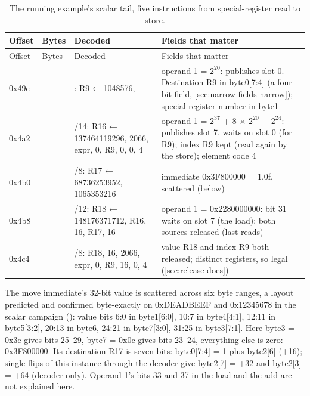 \begin{xltabular}{\linewidth}{@{}l>{\hsize}XX>{\hsize}X@{}}
\caption{The running example's scalar tail, five instructions from special-register read to store.}\label{tab:example-scalar-tail}\\
\toprule
Offset & Bytes & Decoded & Fields that matter \\
\midrule
\endfirsthead
{}
\toprule
Offset & Bytes & Decoded & Fields that matter \\
\midrule
\endhead
0x49e &  & : R9 ← 1048576,  & operand 1 = $2^{20}$: publishes slot 0. Destination R9 in byte0{[}7:4{]}
(a four-bit field, \cref{sec:narrow-fields-narrow}); special
register number in byte1 \\*
0x4a2 &  & /14: R16 ← 137464119296, 2066,
expr, 0, R9, 0, 0, 4 & operand 1 = $2^{37}$ + 8 × $2^{20}$ + $2^{24}$: publishes slot 7, waits on
slot 0 (for R9); index R9 kept (read again by the store); element code 4 \\*
0x4b0 &  & /8: R17 ←
68736253952, 1065353216 & immediate 0x3F800000 = 1.0f, scattered (below) \\*
0x4b8 &  & /12: R18 ← 148176371712, R16, 16, R17, 16 & operand 1 = 0x2280000000: bit 31 waits on slot 7 (the load); both
sources released (last reads) \\*
0x4c4 &  & /8: R18, 16, 2066, expr, 0, R9, 16, 0, 4 & value R18 and index R9 both released; distinct registers, so legal
(\cref{sec:release-does}) \\*
\bottomrule
\end{xltabular}

The move immediate's 32-bit value is scattered across six byte ranges, a layout predicted and confirmed byte-exactly on
0xDEADBEEF and 0x12345678 in the scalar campaign (): value bits 6:0 in byte1{[}6:0{]}, 10:7 in
byte4{[}4:1{]}, 12:11 in byte5{[}3:2{]}, 20:13 in byte6, 24:21 in byte7{[}3:0{]}, 31:25 in byte3{[}7:1{]}. Here byte3 = 0x3e gives bits
25–29, byte7 = 0x0c gives bits 23–24, everything else is zero: 0x3F800000. Its destination R17 is seven bits: byte0{[}7:4{]}
= 1 plus byte2{[}6{]} (+16); single flips of this instance through the decoder give byte2{[}7{]} = +32 and byte2{[}3{]} = +64 (decoder
only). Operand 1's bits 33 and 37 in the load and the add are not explained here.

